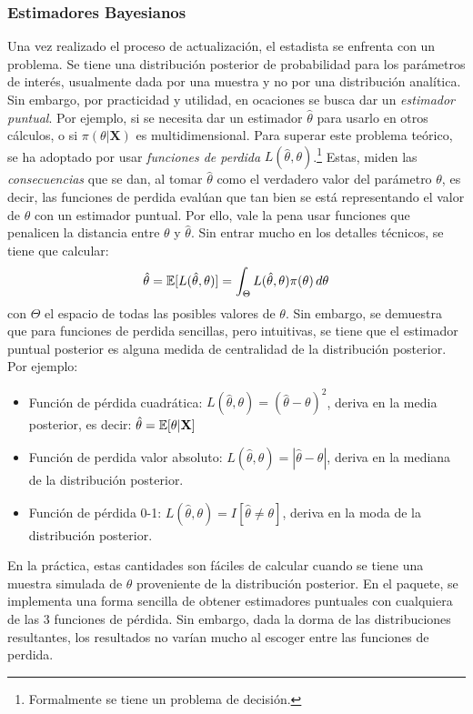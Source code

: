 \documentclass[../Main/Main.tex]{subfiles}
\begin{document}
\subsubsection{Estimadores Bayesianos}
Una vez realizado el proceso de actualización, el estadista se enfrenta con un problema. Se tiene una distribución posterior de probabilidad para los parámetros de interés, usualmente dada por una muestra y no por una distribución analítica. Sin embargo, por practicidad y utilidad, en ocaciones se busca dar un \textit{estimador puntual}. Por ejemplo, si se necesita dar un estimador $\hat \theta$ para usarlo en otros cálculos, o si $\pi(\theta|\mathbf{X})$ es multidimensional. Para superar este problema teórico, se ha adoptado por usar \textit{funciones de perdida} $L(\hat{\theta},\theta)$.\footnote{Formalmente se tiene un problema de decisión.} Estas, miden las \textit{consecuencias} que se dan, al tomar $\hat{\theta}$ como el verdadero valor del parámetro $\theta$, es decir, las funciones de perdida evalúan que tan bien se está representando el valor de $\theta$ con un estimador puntual. Por ello, vale la pena usar funciones que penalicen la distancia entre $\theta$ y $\hat{\theta}$. Sin entrar mucho en los detalles técnicos, se tiene que calcular: 
\begin{align}
\hat{\theta} = \mathbb{E}[L(\hat{\theta},\theta)] = \int_\Theta L(\hat{\theta},\theta) \pi(\theta)\, d\theta
\end{align}
con $\Theta$ el espacio de todas las posibles valores de $\theta$. Sin embargo, se demuestra que para funciones de perdida sencillas, pero intuitivas, se tiene que el estimador puntual posterior es alguna medida de centralidad de la distribución posterior. Por ejemplo:
\begin{itemize}[label={}]
	\item Función de pérdida cuadrática: $L(\hat{\theta},\theta) = (\hat{\theta}-\theta)^2$, deriva en la media posterior, es decir: $\hat{\theta} = \mathbb{E}[\theta|\mathbf{X}]$ 
	\item Función de perdida valor absoluto: $L(\hat{\theta},\theta) = |\hat{\theta}-\theta|$, deriva en la mediana de la distribución posterior.
	\item Función de pérdida 0-1:  $L(\hat{\theta},\theta) = I[\hat{\theta} \neq \theta]$, deriva en la moda de la distribución posterior. 
\end{itemize}

En la práctica, estas cantidades son fáciles de calcular cuando se tiene una muestra simulada de $\theta$ proveniente de la distribución posterior. En el paquete, se implementa una forma sencilla de obtener estimadores puntuales con cualquiera de las 3 funciones de pérdida. Sin embargo, dada la dorma de las distribuciones resultantes, los resultados no varían mucho al escoger entre las funciones de perdida.
\end{document}
